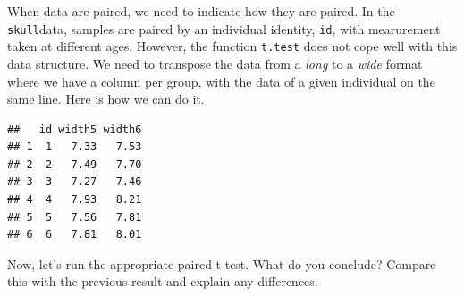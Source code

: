 \documentclass[
  12pt,
]{book}
\newenvironment{Shaded}{\begin{snugshade}}{\end{snugshade}}
\newcommand{\DataTypeTok}[1]{\textcolor[rgb]{0.13,0.29,0.53}{#1}}
\newcommand{\DecValTok}[1]{\textcolor[rgb]{0.00,0.00,0.81}{#1}}
\newcommand{\KeywordTok}[1]{\textcolor[rgb]{0.13,0.29,0.53}{\textbf{#1}}}
\newcommand{\NormalTok}[1]{#1}
\newcommand{\OperatorTok}[1]{\textcolor[rgb]{0.81,0.36,0.00}{\textbf{#1}}}
\newcommand{\OtherTok}[1]{\textcolor[rgb]{0.56,0.35,0.01}{#1}}
\newcommand{\StringTok}[1]{\textcolor[rgb]{0.31,0.60,0.02}{#1}}
\begin{document}
When data are paired, we need to indicate how they are paired. In the \texttt{skull}data, samples are paired by an individual identity, \texttt{id}, with mearurement taken at different ages. However, the function \texttt{t.test} does not cope well with this data structure. We need to transpose the data from a \emph{long} to a \emph{wide} format where we have a column per group, with the data of a given individual on the same line. Here is how we can do it.

\begin{Shaded}
\end{Shaded}

\begin{verbatim}
##   id width5 width6
## 1  1   7.33   7.53
## 2  2   7.49   7.70
## 3  3   7.27   7.46
## 4  4   7.93   8.21
## 5  5   7.56   7.81
## 6  6   7.81   8.01
\end{verbatim}

Now, let's run the appropriate paired t-test. What do you conclude?
Compare this with the previous result and explain any differences.

\begin{Shaded}
\end{Shaded}
\end{document}
